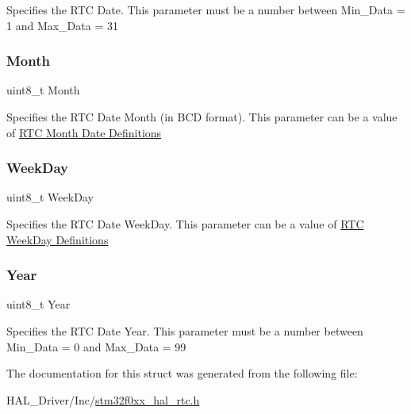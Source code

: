 Specifies the R\+TC Date. This parameter must be a number between Min\+\_\+\+Data = 1 and Max\+\_\+\+Data = 31 \mbox{\label{struct_r_t_c___date_type_def_aee1e733c977d621eae2f655b3fd2a734}} 
\subsubsection{\texorpdfstring{Month}{Month}}
{\footnotesize\ttfamily uint8\+\_\+t Month}

Specifies the R\+TC Date Month (in B\+CD format). This parameter can be a value of \hyperlink{group___r_t_c___month___date___definitions}{R\+TC Month Date Definitions} \mbox{\label{struct_r_t_c___date_type_def_af39df3e46151584e8cb28dfb7de43dec}} 
\subsubsection{\texorpdfstring{Week\+Day}{WeekDay}}
{\footnotesize\ttfamily uint8\+\_\+t Week\+Day}

Specifies the R\+TC Date Week\+Day. This parameter can be a value of \hyperlink{group___r_t_c___week_day___definitions}{R\+TC Week\+Day Definitions} \mbox{\label{struct_r_t_c___date_type_def_ab1fa72fe40c7b93c140c766dec410e29}} 
\subsubsection{\texorpdfstring{Year}{Year}}
{\footnotesize\ttfamily uint8\+\_\+t Year}

Specifies the R\+TC Date Year. This parameter must be a number between Min\+\_\+\+Data = 0 and Max\+\_\+\+Data = 99 

The documentation for this struct was generated from the following file\+:\begin{DoxyCompactItemize}
\item 
H\+A\+L\+\_\+\+Driver/\+Inc/\hyperlink{stm32f0xx__hal__rtc_8h}{stm32f0xx\+\_\+hal\+\_\+rtc.\+h}\end{DoxyCompactItemize}
